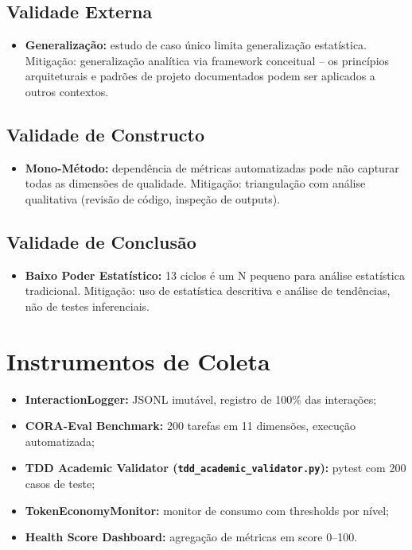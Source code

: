\documentclass[12pt,a4paper,sumario=tradicional]{abntex2}
\begin{document}
\subsection{Validade Externa}

\begin{itemize}
    \item \textbf{Generalização:} estudo de caso único limita generalização estatística. Mitigação: generalização analítica via framework conceitual -- os princípios arquiteturais e padrões de projeto documentados podem ser aplicados a outros contextos.
\end{itemize}

\subsection{Validade de Constructo}

\begin{itemize}
    \item \textbf{Mono-Método:} dependência de métricas automatizadas pode não capturar todas as dimensões de qualidade. Mitigação: triangulação com análise qualitativa (revisão de código, inspeção de outputs).
\end{itemize}

\subsection{Validade de Conclusão}

\begin{itemize}
    \item \textbf{Baixo Poder Estatístico:} 13 ciclos é um N pequeno para análise estatística tradicional. Mitigação: uso de estatística descritiva e análise de tendências, não de testes inferenciais.
\end{itemize}

\section{Instrumentos de Coleta}

\begin{itemize}
    \item \textbf{InteractionLogger:} JSONL imutável, registro de 100\% das interações;
    \item \textbf{CORA-Eval Benchmark:} 200 tarefas em 11 dimensões, execução automatizada;
    \item \textbf{TDD Academic Validator (\texttt{tdd\_academic\_validator.py}):} pytest com 200 casos de teste;
    \item \textbf{TokenEconomyMonitor:} monitor de consumo com thresholds por nível;
    \item \textbf{Health Score Dashboard:} agregação de métricas em score 0--100.
\end{itemize}
\end{document}
